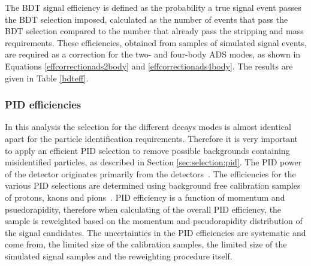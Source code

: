 The BDT signal efficiency is defined as the probability a true signal event passes the BDT selection imposed, calculated as the number of events that pass the BDT selection compared to the number that already pass the stripping and mass requirements. These efficiencies, obtained from samples of simulated signal events, are required as a correction for the two- and four-body ADS modes, as shown in Equations \ref{effcorrectionads2body} and \ref{effcorrectionads4body}. The results are given in Table \ref{bdteff}.

\begin{table}[h]
\centering
{}
\caption{Summary of the BDT efficiencies used in the \CP fit.}
\label{bdteff}
\end{table}


\subsubsection{PID efficiencies}
\label{sec:cpfit:efficiencies:pid}

In this analysis the selection for the different \Dz decays modes is almost identical apart for the particle identification requirements. Therefore it is very important to apply an efficient PID selection to remove possible backgrounds containing misidentified particles, as described in Section \ref{sec:selection:pid}. The PID power of the detector originates primarily from the \rich detectors~\cite{LHCb-DP-2012-003,richrun2}. The efficiencies for the various PID selections are determined using background free calibration samples of protons, kaons and pions~\cite{LHCb-PUB-2016-021,LHCb-PUB-2016-005}. PID efficiency is a function of momentum and psuedorapidity, therefore when calculating of the overall PID efficiency, the sample is reweighted based on the momentum and pseudorapidity distribution of the signal candidates. The uncertainties in the PID efficiencies are systematic and come from, the limited size of the calibration samples, the limited size of the simulated signal samples and the reweighting procedure itself.

